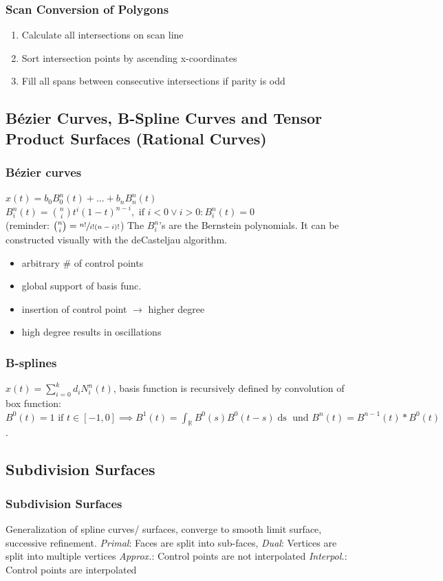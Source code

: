 \documentclass[a4paper,10pt]{article}
\newcommand*\good{\item[\textcolor{goodgreen}{\(\bm{+}\)}]}
\newcommand*\bad{\item[\textcolor{badred}{\(\bm{-}\)}]}
\begin{document}
\subsubsection{Scan Conversion of Polygons} 
\begin{enumerate}
    \item Calculate all intersections on scan line
    \item Sort intersection points by ascending x-coordinates
    \item Fill all spans between consecutive intersections if parity is odd
\end{enumerate}

\subsection{Bézier Curves, B-Spline Curves and Tensor Product Surfaces (Rational Curves)}
\subsubsection{Bézier curves}
\( x(t) = b_0 B^n_0(t) + \ldots + b_n B^n_n (t) \) \\
\( B^n_i(t) = \binom{n}{i} t^i (1-t)^{n-i}, \text{ if } i < 0 \lor i >0: B^n_i (t) = 0 \) \\
(reminder: \( \binom{n}{i} = \sfrac{n!}{i!(n-i)!} \)) The \( B^n_i \)'s are the Bernstein polynomials.
It can be constructed visually with the deCasteljau algorithm. 
\begin{itemize}
    \good arbitrary \# of control points
    \bad global support of basis func.
    \bad insertion of control point \( \to  \) higher degree
    \bad high degree results in oscillations
\end{itemize}

\subsubsection{B-splines}
\( x(t) = \sum_{i=0}^k d_i N_i^n (t) \), basis function is recursively defined by convolution of box function: 
\( B^0(t) = 1 \text{ if } t \in [-1, 0] \implies B^1(t) = \int_\mathbb{R} B^0(s) B^0(t-s) \mathop{ds} \text{ und } B^n(t) = B^{n-1}(t) * B^0(t)\).

\subsection{Subdivision Surfaces}
\subsubsection{Subdivision Surfaces} Generalization of spline curves/ surfaces, converge to smooth limit surface, successive refinement.
\textit{Primal}: Faces are split into sub-faces,
\textit{Dual}: Vertices are split into multiple vertices
\textit{Approx.}: Control points are not interpolated
\textit{Interpol.}: Control points are interpolated
\end{document}
